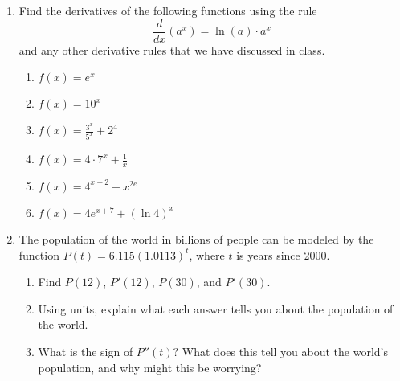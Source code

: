 \documentclass[11pt]{article}
\begin{document}
\drawtitle

\begin{enumerate}
\item Find the derivatives of the following functions using the rule
  \[
  \frac{d}{dx}\left(a^x\right)=\ln(a)\cdot a^x
  \]
  and any other derivative rules that we have discussed in class.
  \begin{enumerate}
  \item $\displaystyle f(x)=e^x$ \vfill
  \item $\displaystyle f(x)=10^x$ \vfill
    \newpage
  \item $\displaystyle f(x)=\frac{3^x}{5^x}+2^4$ \vfill 
  \item $\displaystyle f(x)=4\cdot 7^x+\frac{1}{x}$ \vfill
    \newpage
  \item $\displaystyle f(x)=4^{x+2}+x^{2e}$ \vfill
  \item $\displaystyle f(x)=4e^{x+7}+(\ln 4)^x$\vfill
  \end{enumerate}
  \newpage

\item The population of the world in billions of people can be modeled
  by the function $P(t) = 6.115(1.0113)^t$, where $t$ is years since 2000.
  \begin{enumerate}
  \item Find $P(12)$, $P'(12)$, $P(30)$, and $P'(30)$.
    \vfill
  \item Using units, explain what each answer tells you about the
    population of the world.
    \vfill
  \item What is the sign of $P''(t)$?  What does this tell you about
    the world's population, and why might this be worrying?
    \vfill
  \end{enumerate}


\end{enumerate}
\end{document}
